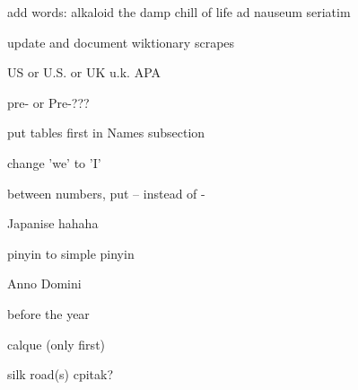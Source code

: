 add words:
alkaloid
the damp chill of life
ad nauseum
seriatim

update and document wiktionary scrapes

US or U.S. or UK u.k. APA

pre- or Pre-???


put tables first in Names subsection

change 'we' to 'I'

between numbers, put -- instead of -

Japanise hahaha

pinyin to simple pinyin


Anno Domini

before the year

calque (only first)

silk road(s) cpitak?